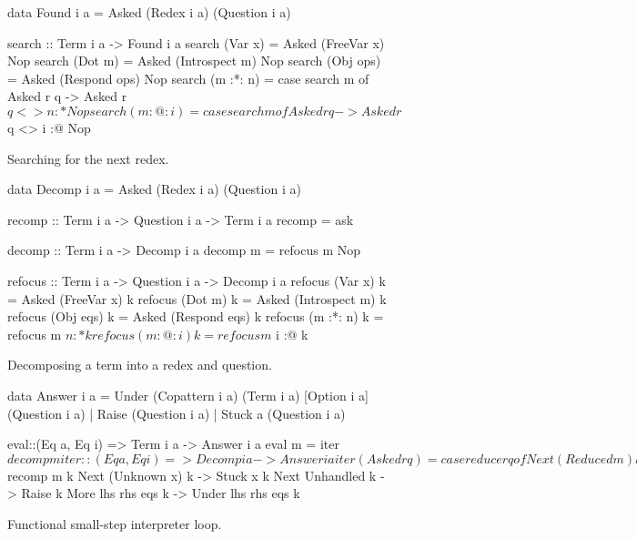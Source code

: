 \documentclass[sigplan,screen]{acmart}
\newcommand{\basicstylesize}{\small}
\begin{document}
\begin{figure}
\centering
\begin{haskell}
data Found i a
  = Asked (Redex i a) (Question i a)

search :: Term i a -> Found i a
search (Var x)   = Asked (FreeVar x) Nop
search (Dot m)   = Asked (Introspect m) Nop
search (Obj ops) = Asked (Respond ops) Nop
search (m :*: n) = case search m of
  Asked r q -> Asked r $ q <> n :* Nop
search (m :@: i) = case search m of
  Asked r q -> Asked r $ q <> i :@ Nop
\end{haskell}
\caption{Searching for the next redex.}
\label{fig:block-search-code}
\end{figure}

\begin{figure}
\centering
\renewcommand{\basicstylesize}{\footnotesize}
\begin{haskell}
data Decomp i a = Asked (Redex i a) (Question i a)

recomp :: Term i a -> Question i a -> Term i a
recomp = ask

decomp :: Term i a -> Decomp i a
decomp m = refocus m Nop

refocus :: Term i a -> Question i a -> Decomp i a
refocus (Var x)   k = Asked (FreeVar x) k
refocus (Dot m)   k = Asked (Introspect m) k
refocus (Obj eqs) k = Asked (Respond eqs) k
refocus (m :*: n) k = refocus m $ n :* k
refocus (m :@: i) k = refocus m $ i :@ k
\end{haskell}
\caption{Decomposing a term into a redex and question.}
\label{fig:block-decomp-code}
\end{figure}

\begin{figure}
\centering
\renewcommand{\basicstylesize}{\footnotesize}
\begin{haskell}
data Answer i a
  = Under (Copattern i a) (Term i a)
          [Option i a]    (Question i a)
  | Raise (Question i a)
  | Stuck a (Question i a)

eval::(Eq a, Eq i) => Term i a -> Answer i a
eval m = iter $ decomp m

iter::(Eq a, Eq i) => Decomp i a -> Answer i a
iter (Asked r q) = case reduce r q of
  Next (Reduced m) k -> eval $ recomp m k
  Next (Unknown x) k -> Stuck x k
  Next Unhandled   k -> Raise k
  More lhs rhs eqs k -> Under lhs rhs eqs k
\end{haskell}
\caption{Functional small-step interpreter loop.}
\label{fig:block-small-step-code}
\end{figure}
\end{document}
